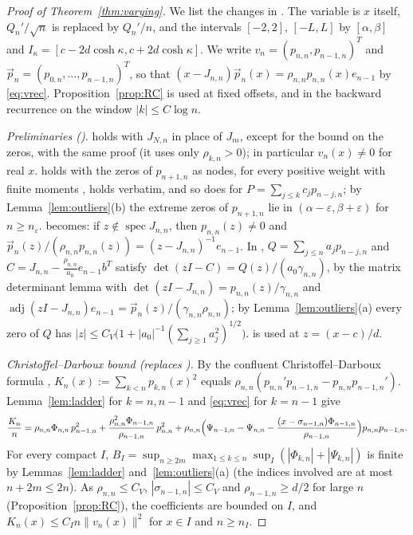 \documentclass[11pt]{amsart}
\theoremstyle{definition}
\theoremstyle{remark}
\numberwithin{equation}{section}
\newcommand{\eps}{\varepsilon}
\begin{document}
\begin{proof}[Proof of Theorem~\ref{thm:varying}]
We list the changes in \cite[Sections~{\ref{M-sec:prelim}}--{\ref{M-sec:proof}}]{Main}. The variable is $x$ itself, $Q_n'/\sqrt n$ is replaced by $Q_n'/n$, and the intervals $[-2,2]$, $[-L,L]$ by $[\alpha,\beta]$ and $I_\kappa=[c-2d\cosh\kappa,c+2d\cosh\kappa]$. We write $v_n=(p_{n,n},p_{n-1,n})^T$ and $\vec p_n=(p_{0,n},\dots,p_{n-1,n})^T$, so that $(x-J_{n,n})\vec p_n(x)=\rho_{n,n}p_{n,n}(x)e_{n-1}$ by \eqref{eq:vrec}. Proposition~\ref{prop:RC} is used at fixed offsets, and in the backward recurrence on the window $|k|\le C\log n$.

\emph{Preliminaries (\cite[Section~\ref{M-sec:prelim}]{Main}).} \cite[Lemma~\ref{M-lem:zeros}]{Main} holds with $J_{N,n}$ in place of $J_m$, except for the bound on the zeros, with the same proof (it uses only $\rho_{k,n}>0$); in particular $v_n(x)\ne0$ for real $x$. \cite[Lemma~\ref{M-lem:quadrature}]{Main} holds with the zeros of $p_{n+1,n}$ as nodes, for every positive weight with finite moments \cite[Theorems~3.4.1--3.4.2]{Sz}, \cite[Lemma~\ref{M-lem:constancy}]{Main} holds verbatim, and so does \cite[Lemma~\ref{M-lem:quasi}]{Main} for $P=\sum_{j\le k}c_jp_{n-j,n}$; by Lemma~\ref{lem:outliers}(b) the extreme zeros of $p_{n+1,n}$ lie in $(\alpha-\eps,\beta+\eps)$ for $n\ge n_\eps$. \cite[Lemma~\ref{M-lem:resolvent}]{Main} becomes: if $z\notin\operatorname{spec}J_{n,n}$, then $p_{n,n}(z)\ne0$ and $\vec p_n(z)/(\rho_{n,n}p_{n,n}(z))=(z-J_{n,n})^{-1}e_{n-1}$. In \cite[Lemma~\ref{M-lem:colleague}]{Main}, $Q=\sum_{j\le n}a_jp_{n-j,n}$ and $C=J_{n,n}-\frac{\rho_{n,n}}{a_0}e_{n-1}b^T$ satisfy $\det(zI-C)=Q(z)/(a_0\gamma_{n,n})$, by the matrix determinant lemma with $\det(zI-J_{n,n})=p_{n,n}(z)/\gamma_{n,n}$ and $\operatorname{adj}(zI-J_{n,n})e_{n-1}=\vec p_n(z)/(\gamma_{n,n}\rho_{n,n})$; by Lemma~\ref{lem:outliers}(a) every zero of $Q$ has $|z|\le C_V\bigl(1+|a_0|^{-1}(\sum_{j\ge1}a_j^2)^{1/2}\bigr)$. \cite[Lemma~\ref{M-lem:limit}]{Main} is used at $z=(x-c)/d$.

\emph{Christoffel--Darboux bound (replaces \cite[Lemma~\ref{M-lem:cd}]{Main}).} By the confluent Christoffel--Darboux formula \cite[Theorem~3.2.2]{Sz}, $K_n(x):=\sum_{k<n}p_{k,n}(x)^2$ equals $\rho_{n,n}(p_{n,n}'p_{n-1,n}-p_{n,n}p_{n-1,n}')$. Lemma~\ref{lem:ladder} for $k=n,n-1$ and \eqref{eq:vrec} for $k=n-1$ give
\[
\frac{K_n}n=\rho_{n,n}\Phi_{n,n}\,p_{n-1,n}^2+\frac{\rho_{n,n}^2\Phi_{n-1,n}}{\rho_{n-1,n}}\,p_{n,n}^2+\rho_{n,n}\Bigl(\Psi_{n-1,n}-\Psi_{n,n}-\frac{(x-\sigma_{n-1,n})\Phi_{n-1,n}}{\rho_{n-1,n}}\Bigr)p_{n,n}p_{n-1,n}.
\]
For every compact $I$, $B_I=\sup_{n\ge2m}\max_{1\le k\le n}\sup_I(|\Phi_{k,n}|+|\Psi_{k,n}|)$ is finite by Lemmas~\ref{lem:ladder} and~\ref{lem:outliers}(a) (the indices involved are at most $n+2m\le2n$). As $\rho_{n,n}\le C_V$, $|\sigma_{n-1,n}|\le C_V$ and $\rho_{n-1,n}\ge d/2$ for large $n$ (Proposition~\ref{prop:RC}), the coefficients are bounded on $I$, and $K_n(x)\le C_In\|v_n(x)\|^2$ for $x\in I$ and $n\ge n_I$.


\end{proof}
\end{document}
